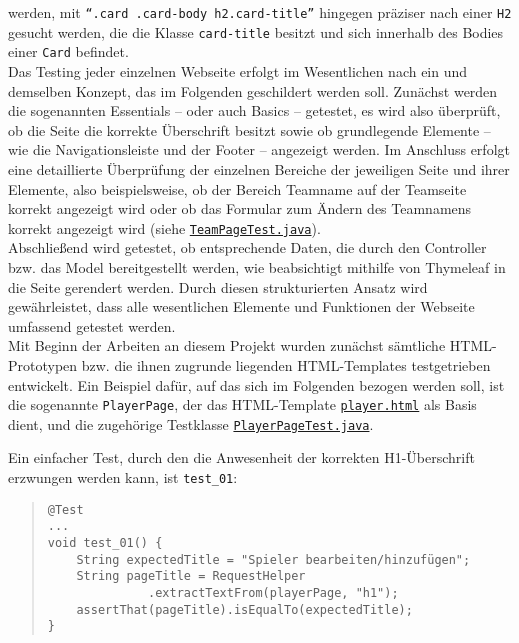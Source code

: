 werden, mit \texttt{``.card .card-body h2.card-title''} hingegen präziser nach 
einer \texttt{H2} gesucht werden, die die Klasse \texttt{card-title} besitzt und 
sich innerhalb des Bodies einer \texttt{Card} befindet. \\ 
Das Testing jeder einzelnen Webseite erfolgt im Wesentlichen nach ein und 
demselben Konzept, das im Folgenden geschildert werden soll. Zunächst werden die 
sogenannten Essentials -- oder auch Basics -- getestet, es wird also überprüft, ob 
die Seite die korrekte Überschrift besitzt sowie ob grundlegende Elemente -- wie 
die Navigationsleiste und der Footer -- angezeigt werden. Im Anschluss erfolgt eine 
detaillierte Überprüfung der einzelnen Bereiche der jeweiligen Seite und ihrer 
Elemente, also beispielsweise, ob der Bereich Teamname auf der Teamseite korrekt 
angezeigt wird oder ob das Formular zum Ändern des Teamnamens korrekt angezeigt 
wird (siehe \href{https://github.com/FlorianOhmes/bat_spielzeitenplaner/blob/main/spielzeitenplaner/src/test/java/de/bathesis/spielzeitenplaner/templates/team/TeamPageTest.java}{\texttt{TeamPageTest.java}}). \\ 
Abschließend wird getestet, ob entsprechende Daten, die durch den Controller bzw. 
das Model bereitgestellt werden, wie beabsichtigt mithilfe von Thymeleaf in die 
Seite gerendert werden. Durch diesen strukturierten Ansatz wird gewährleistet, dass 
alle wesentlichen Elemente und Funktionen der Webseite umfassend getestet 
werden. \\ 
Mit Beginn der Arbeiten an diesem Projekt wurden zunächst sämtliche HTML-Prototypen 
bzw. die ihnen zugrunde liegenden HTML-Templates testgetrieben entwickelt. Ein 
Beispiel dafür, auf das sich im Folgenden bezogen werden soll, ist die sogenannte 
\texttt{PlayerPage}, der das HTML-Template \href{https://github.com/FlorianOhmes/bat_spielzeitenplaner/blob/main/spielzeitenplaner/src/main/resources/templates/team/player.html}{\texttt{player.html}} als Basis dient, und die zugehörige 
Testklasse \href{https://github.com/FlorianOhmes/bat_spielzeitenplaner/blob/main/spielzeitenplaner/src/test/java/de/bathesis/spielzeitenplaner/templates/team/PlayerPageTest.java}{\texttt{PlayerPageTest.java}}.

\pagebreak

Ein einfacher Test, durch den die Anwesenheit der korrekten H1-Überschrift 
erzwungen werden kann, ist \texttt{test\_01}: 

\begin{quote}
\begin{verbatim}
@Test
...
void test_01() {
    String expectedTitle = "Spieler bearbeiten/hinzufügen";
    String pageTitle = RequestHelper
              .extractTextFrom(playerPage, "h1");
    assertThat(pageTitle).isEqualTo(expectedTitle);
}
\end{verbatim}
\end{quote}

